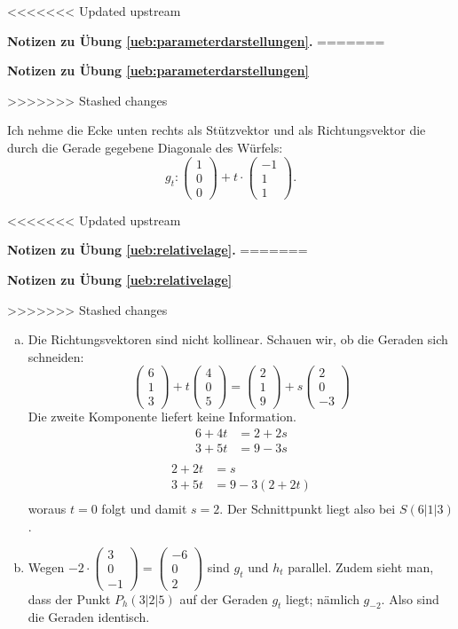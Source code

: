 \documentclass[%
11pt,%
twoside,%
titlepage,%
<<<<<<< Updated upstream
german,%
=======
swissgerman,%
>>>>>>> Stashed changes
headsepline%
]{scrartcl}
\newcommand{\faReturnGray}{\textcolor{gray}{\faMailReply}} %
\theoremstyle{definition}
\theoremstyle{plain}
\newcommand{\concatueb}[1]{ueb:#1}%
\newcommand{\concatlsg}[1]{lsg:#1}%
\newenvironment{lsg}[1]{%
<<<<<<< Updated upstream
    \par\noindent\textbf{Notizen zu Übung \ref{\concatueb{#1}}.}%
    \label{\concatlsg{#1}}
=======
    \par\noindent\textbf{Notizen zu Übung \ref{\concatueb{#1}}}\label{\concatlsg{#1}}
    \hfill\hyperref[\concatueb{#1}]{\faReturnGray}\par %
>>>>>>> Stashed changes
}{%
    \par%
}
\begin{document}
\begin{lsg}{parameterdarstellungen}
Ich nehme die Ecke unten rechts als Stützvektor und als Richtungsvektor die durch die Gerade gegebene Diagonale des Würfels:
$$g_t:\begin{pmatrix}
    1\\0\\0
\end{pmatrix}+t\cdot\begin{pmatrix}
    -1\\1\\1
\end{pmatrix}.$$
\end{lsg}
\begin{lsg}{relativelage}
\begin{enumerate}[a)]
    \item Die Richtungsvektoren sind nicht kollinear. Schauen wir, ob die Geraden sich schneiden:    $$\begin{pmatrix}6\\1\\3\end{pmatrix}+t\begin{pmatrix}4\\0\\5\end{pmatrix}=\begin{pmatrix}2\\1\\9\end{pmatrix}+s\begin{pmatrix}2\\0\\-3\end{pmatrix}$$
    Die zweite Komponente liefert keine Information.
    \begin{align*}
        6+4t &= 2+2s\\
        3+5t &= 9-3s\\
    \end{align*}
        \begin{align*}
        2+2t &= s\\
        3+5t &= 9-3(2+2t)\\
    \end{align*}
    woraus $t=0$ folgt und damit $s=2$. Der Schnittpunkt liegt also bei $S(6|1|3)$.

    \item Wegen $-2\cdot\begin{pmatrix}
        3\\0\\-1
    \end{pmatrix}=\begin{pmatrix}
        -6\\0\\2
    \end{pmatrix}$ sind $g_t$ und $h_t$ parallel. Zudem sieht man, dass der Punkt $P_h(3|2|5)$ auf der Geraden $g_t$ liegt; nämlich $g_{-2}$. Also sind die Geraden identisch.


\end{enumerate}
\end{lsg}
\end{document}
